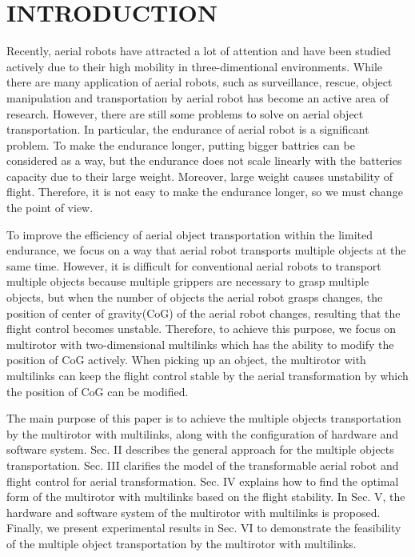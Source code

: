 \section{INTRODUCTION}
Recently, aerial robots have attracted a lot of attention and have been studied actively due to their high mobility in three-dimentional environments\cite{Kumar2012}. While there are many application of aerial robots, such as surveillance\cite{surveillance}, rescue\cite{rescue}, object manipulation and transportation by aerial robot has become an active area of research\cite{lindsey2012}\cite{Mellinger2011}\cite{ZhaoICRA2017}\cite{Bernard2009}\cite{Hugh2012}. However, there are still some problems to solve on aerial object transportation. In particular, the endurance of aerial robot is a significant problem. To make the endurance longer, putting bigger battries can be considered as a way, but the endurance does not scale linearly with the batteries capacity due to their large weight. Moreover, large weight causes unstability of flight. Therefore, it is not easy to make the endurance longer, so we must change the point of view. 
\par
To improve the efficiency of aerial object transportation within the limited endurance, we focus on a way that aerial robot transports multiple objects at the same time. However, it is difficult for conventional aerial robots to transport multiple objects because multiple grippers are necessary to grasp multiple objects, but when the number of objects the aerial robot grasps changes, the position of center of gravity(CoG) of the aerial robot changes, resulting that the flight control becomes unstable. Therefore, to achieve this purpose, we focus on multirotor with two-dimensional multilinks\cite{Zhao2016} which has the ability to modify the position of CoG actively. When picking up an object, the multirotor with multilinks can keep the flight control stable by the aerial transformation by which the position of CoG can be modified. 
\par
The main purpose of this paper is to achieve the multiple objects transportation by the multirotor with multilinks, along with the configuration of hardware and software system. Sec. II describes the general approach for the multiple objects transportation. Sec. III clarifies the model of the transformable aerial robot and flight control for aerial transformation.  Sec. IV explains how to find the optimal form of the multirotor with multilinks based on the flight stability. In Sec. V, the hardware and software system of the multirotor with multilinks is proposed. Finally, we present experimental results in Sec. VI to demonstrate the feasibility of the multiple object transportation by the multirotor with multilinks. 

